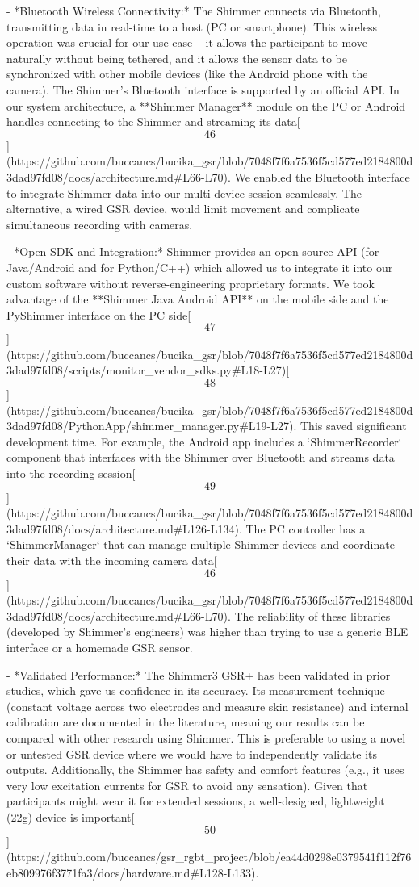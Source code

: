 \documentclass[12pt,a4paper]{article}
\begin{document}
- *Bluetooth Wireless Connectivity:* The Shimmer connects via Bluetooth,
  transmitting data in real-time to a host (PC or smartphone). This
  wireless operation was crucial for our use-case -- it allows the
  participant to move naturally without being tethered, and it allows
  the sensor data to be synchronized with other mobile devices (like the
  Android phone with the camera). The Shimmer's Bluetooth interface is
  supported by an official API. In our system architecture, a **Shimmer
  Manager** module on the PC or Android handles connecting to the
  Shimmer and streaming its
  data[\[46\]](https://github.com/buccancs/bucika_gsr/blob/7048f7f6a7536f5cd577ed2184800d3dad97fd08/docs/architecture.md#L66-L70).
  We enabled the Bluetooth interface to integrate Shimmer data into our
  multi-device session seamlessly. The alternative, a wired GSR device,
  would limit movement and complicate simultaneous recording with
  cameras.

- *Open SDK and Integration:* Shimmer provides an open-source API (for
  Java/Android and for Python/C++) which allowed us to integrate it into
  our custom software without reverse-engineering proprietary formats.
  We took advantage of the **Shimmer Java Android API** on the mobile
  side and the PyShimmer interface on the PC
  side[\[47\]](https://github.com/buccancs/bucika_gsr/blob/7048f7f6a7536f5cd577ed2184800d3dad97fd08/scripts/monitor_vendor_sdks.py#L18-L27)[\[48\]](https://github.com/buccancs/bucika_gsr/blob/7048f7f6a7536f5cd577ed2184800d3dad97fd08/PythonApp/shimmer_manager.py#L19-L27).
  This saved significant development time. For example, the Android app
  includes a `ShimmerRecorder` component that interfaces with the
  Shimmer over Bluetooth and streams data into the recording
  session[\[49\]](https://github.com/buccancs/bucika_gsr/blob/7048f7f6a7536f5cd577ed2184800d3dad97fd08/docs/architecture.md#L126-L134).
  The PC controller has a `ShimmerManager` that can manage multiple
  Shimmer devices and coordinate their data with the incoming camera
  data[\[46\]](https://github.com/buccancs/bucika_gsr/blob/7048f7f6a7536f5cd577ed2184800d3dad97fd08/docs/architecture.md#L66-L70).
  The reliability of these libraries (developed by Shimmer's engineers)
  was higher than trying to use a generic BLE interface or a homemade
  GSR sensor.

- *Validated Performance:* The Shimmer3 GSR+ has been validated in prior
  studies, which gave us confidence in its accuracy. Its measurement
  technique (constant voltage across two electrodes and measure skin
  resistance) and internal calibration are documented in the literature,
  meaning our results can be compared with other research using Shimmer.
  This is preferable to using a novel or untested GSR device where we
  would have to independently validate its outputs. Additionally, the
  Shimmer has safety and comfort features (e.g., it uses very low
  excitation currents for GSR to avoid any sensation). Given that
  participants might wear it for extended sessions, a well-designed,
  lightweight (22g) device is
  important[\[50\]](https://github.com/buccancs/gsr_rgbt_project/blob/ea44d0298e0379541f112f76eb809976f3771fa3/docs/hardware.md#L128-L133).
\end{document}
